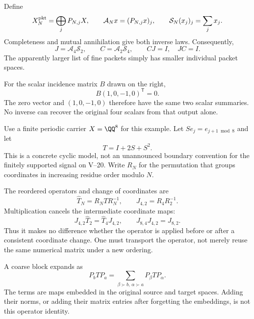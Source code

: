 Define
\[
X_N^{\rm pkt}=\bigoplus_j P_{N,j}X,
\qquad
\mathcal A_Nx=(P_{N,j}x)_j,
\qquad
\mathcal S_N(x_j)_j=\sum_jx_j.
\]
Completeness and mutual annihilation give both inverse laws. Consequently,
\[
J=\mathcal A_4\mathcal S_2,\qquad C=\mathcal A_2\mathcal S_4,
\qquad CJ=I,\quad JC=I.
\]
The apparently larger list of fine packets simply has smaller individual packet spaces.

For the scalar incidence matrix $B$ drawn on the right,
\[
B(1,0,-1,0)^\mathsf T=0.
\]
The zero vector and $(1,0,-1,0)$ therefore have the same two scalar summaries. No inverse can recover the original four scalars from that output alone.


Use a finite periodic carrier $X=\QQ^8$ for this example. Let $Se_j=e_{j+1\bmod8}$ and let
\[
T=I+2S+S^2.
\]
This is a concrete cyclic model, not an unannounced boundary convention for the finitely supported signal on V--20. Write $R_N$ for the permutation that groups coordinates in increasing residue order modulo $N$.


The reordered operators and change of coordinates are
\[
\widehat T_N=R_NTR_N^{-1},\qquad J_{4,2}=R_4R_2^{-1}.
\]
Multiplication cancels the intermediate coordinate maps:
\[
J_{4,2}\widehat T_2=\widehat T_4J_{4,2},\qquad
J_{8,4}J_{4,2}=J_{8,2}.
\]
Thus it makes no difference whether the operator is applied before or after a consistent coordinate change. One must transport the operator, not merely reuse the same numerical matrix under a new ordering.

A coarse block expands as
\[
P_bTP_a=\sum_{\beta\succ b,\,\alpha\succ a}P_\beta TP_\alpha.
\]
The terms are maps embedded in the original source and target spaces. Adding their norms, or adding their matrix entries after forgetting the embeddings, is not this operator identity.



